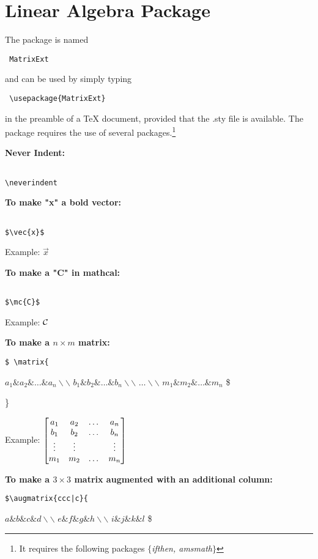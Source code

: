 \documentclass[12pt,letterpaper]{article}
\newcommand{\vertsp}{\vspace{0.4 in}}
\begin{document}
\section*{Linear Algebra Package}
The package is named \begin{verbatim} MatrixExt \end{verbatim} 
and can be used by simply typing \begin{verbatim} \usepackage{MatrixExt} \end{verbatim} 
in the preamble of a TeX document, provided that the .sty file is available.  The package requires the use of several packages.\footnote{It requires the following packages $\{$\emph{ifthen, amsmath}$\}$}
\vertsp

{\bf Never Indent:}
\begin{verbatim}

\neverindent
\end{verbatim}

\vertsp

{\bf To make "x" a bold vector:}
\begin{verbatim}

$\vec{x}$
\end{verbatim} 
Example: $\vec{x}$\\
\vertsp

{\bf To make a "C" in mathcal:}
\begin{verbatim}

$\mc{C}$
\end{verbatim}
Example: ${\mathcal{C}}$\\
\vertsp

{\bf To make a $n \times m$ matrix:}
\begin{verbatim}
$ \matrix{
\end{verbatim}
$a_1 \& a_2 \& \dots \& a_n \backslash \backslash$
$b_1 \& b_2 \& \dots \& b_n \backslash \backslash$
$\dots \backslash \backslash$
$m_1 \& m_2 \& \dots \& m_n$ \$
\vspace{10 pt}

\}

Example: $\begin{bmatrix} a_1 & a_2 & \dots & a_n \\ b_1 & b_2 & \dots & b_n \\ \vdots & \vdots & & \vdots \\ m_1 & m_2 & \dots & m_n \end{bmatrix}$

\pagebreak


{\bf To make a $3 \times 3$ matrix augmented with an additional column:}
\begin{verbatim}
$\augmatrix{ccc|c}{
\end{verbatim}
$a \& b \& c \& d \backslash \backslash$
$e \& f \& g \& h \backslash \backslash$
$i \& j \& k \& l$ \$
\vspace{10 pt}
\end{document}
